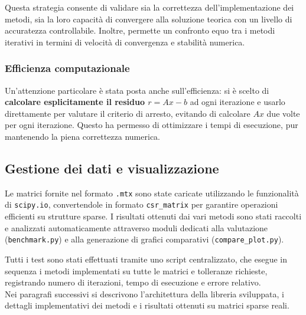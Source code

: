 Questa strategia consente di validare sia la correttezza dell'implementazione dei metodi, sia la loro capacità di convergere alla soluzione teorica con un livello di accuratezza controllabile. Inoltre, permette un confronto equo tra i metodi iterativi in termini di velocità di convergenza e stabilità numerica.


\subsubsection{Efficienza computazionale}
Un’attenzione particolare è stata posta anche sull’efficienza: si è scelto di \textbf{calcolare esplicitamente il residuo \(r = Ax - b\)} ad ogni iterazione e usarlo direttamente per valutare il criterio di arresto, evitando di calcolare \(Ax\) due volte per ogni iterazione. Questo ha permesso di ottimizzare i tempi di esecuzione, pur mantenendo la piena correttezza numerica.\\



\subsection{Gestione dei dati e visualizzazione}

Le matrici fornite nel formato \texttt{.mtx} sono state caricate utilizzando le funzionalità di \texttt{scipy.io}, convertendole in formato \texttt{csr\_matrix} per garantire operazioni efficienti su strutture sparse. I risultati ottenuti dai vari metodi sono stati raccolti e analizzati automaticamente attraverso moduli dedicati alla valutazione (\texttt{benchmark.py}) e alla generazione di grafici comparativi (\texttt{compare\_plot.py}).

Tutti i test sono stati effettuati tramite uno script centralizzato, che esegue in sequenza i metodi implementati su tutte le matrici e tolleranze richieste, registrando numero di iterazioni, tempo di esecuzione e errore relativo.\\

Nei paragrafi successivi si descrivono l’architettura della libreria sviluppata, i dettagli implementativi dei metodi e i risultati ottenuti su matrici sparse reali.